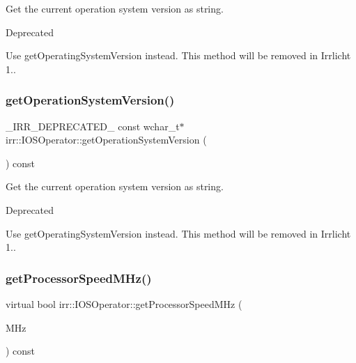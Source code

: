 Get the current operation system version as string. 

\begin{DoxyRefDesc}{Deprecated}
\item[\hyperlink{deprecated__deprecated000016}{Deprecated}]Use get\+Operating\+System\+Version instead. This method will be removed in Irrlicht 1.. \end{DoxyRefDesc}
\mbox{\label{classirr_1_1IOSOperator_a8d634ee79439742b7397ca7ad7a3812a}} 
\subsubsection{\texorpdfstring{get\+Operation\+System\+Version()}{getOperationSystemVersion()}\hspace{0.1cm}{\footnotesize\ttfamily [2/2]}}
{\footnotesize\ttfamily \+\_\+\+I\+R\+R\+\_\+\+D\+E\+P\+R\+E\+C\+A\+T\+E\+D\+\_\+ const wchar\+\_\+t$\ast$ irr\+::\+I\+O\+S\+Operator\+::get\+Operation\+System\+Version (\begin{DoxyParamCaption}{ }\end{DoxyParamCaption}) const\hspace{0.3cm}{\ttfamily [inline]}}



Get the current operation system version as string. 

\begin{DoxyRefDesc}{Deprecated}
\item[\hyperlink{deprecated__deprecated000042}{Deprecated}]Use get\+Operating\+System\+Version instead. This method will be removed in Irrlicht 1.. \end{DoxyRefDesc}
\mbox{\label{classirr_1_1IOSOperator_abc61b8016ec35125ef94adea42209ecd}} 
\subsubsection{\texorpdfstring{get\+Processor\+Speed\+M\+Hz()}{getProcessorSpeedMHz()}\hspace{0.1cm}{\footnotesize\ttfamily [1/2]}}
{\footnotesize\ttfamily virtual bool irr\+::\+I\+O\+S\+Operator\+::get\+Processor\+Speed\+M\+Hz (\begin{DoxyParamCaption}\item[{\hyperlink{namespaceirr_a0416a53257075833e7002efd0a18e804}{u32} $\ast$}]{M\+Hz }\end{DoxyParamCaption}) const\hspace{0.3cm}{\ttfamily [pure virtual]}}



